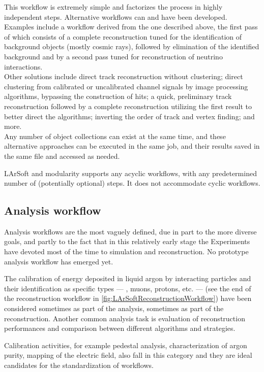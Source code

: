This workflow is extremely simple and factorizes the process in highly independent steps.
Alternative workflows can and have been developed.\\
Examples include a workflow derived from the one described above,
the first pass of which consists of a complete reconstruction
tuned for the identification of background objects (mostly cosmic rays),
followed by elimination of the identified background %
and by a second pass tuned for reconstruction of neutrino interactions.\\
Other solutions include direct track reconstruction without clustering;
direct clustering from calibrated or uncalibrated channel signals by image processing algorithms,
bypassing the construction of hits;
a quick, preliminary track reconstruction
followed by a complete reconstruction utilizing the first result to better direct the algorithms;
inverting the order of track and vertex finding;
and more.\\
Any number of object collections can exist at the same time,
and these alternative approaches can be executed in the same job,
and their results saved in the same file and accessed as needed.

LArSoft and \ART modularity supports any acyclic workflows,
with any predetermined number of (potentially optional) steps.
It does not accommodate cyclic workflows.


\subsection{Analysis workflow}
\label{ssec:Workflows:Analysis}

Analysis workflows are the most vaguely defined,
due in part to the more diverse goals,
and partly to the fact that in this relatively early stage the Experiments
have devoted most of the time to simulation and reconstruction.
No prototype analysis workflow has emerged yet.

The calibration of energy deposited in liquid argon by interacting particles
and their identification as specific types --- \eg, muons, protons, etc. ---
 (see the end of the reconstruction workflow in \cref{fig:LArSoftReconstructionWorkflow})
have been considered sometimes as part of the analysis, sometimes as part of the reconstruction.
Another common analysis task is evaluation of reconstruction performances
and comparison between different algorithms and strategies.

Calibration activities, for example pedestal analysis,
characterization of argon purity, mapping of the electric field,
also fall in this category and they are ideal candidates for the standardization of workflows.
